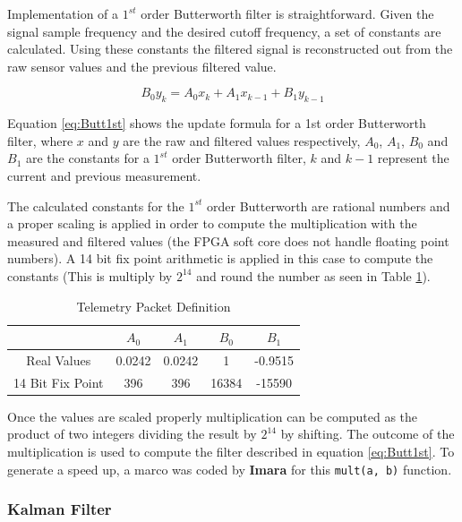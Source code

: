 \documentclass{article}
\begin{document}
Implementation of a $1^{st}$ order Butterworth filter is straightforward. Given the signal sample frequency and the desired cutoff frequency, a set of constants are calculated. Using these constants the filtered signal is reconstructed out from the raw sensor values and the previous filtered value.

\begin{equation}
	 B_0 y_k = A_0 x_k + A_1 x_{k-1} + B_1 y_{k-1}
	 \label{eq:Butt1st}
\end{equation}

Equation \ref{eq:Butt1st} shows the update formula for a 1st order Butterworth filter, where $x$ and $y$ are the raw and filtered values respectively, $A_0$, $A_1$, $B_0$ and $B_1$ are the constants for a $1^{st}$ order Butterworth filter, $k$ and $k-1$ represent the current and previous measurement.

The calculated constants for the $1^{st}$ order Butterworth are rational numbers and a proper scaling is applied in order to compute the multiplication with the measured and filtered values (the FPGA soft core does not handle floating point numbers). A 14 bit fix point arithmetic is applied in this case to compute the constants (This is multiply by $2^{14}$ and round the number as seen in Table \ref{tbl:ButtConstants}).

\begin{table}[ht]
\centering
\caption{Telemetry Packet Definition}
\begin{tabular}{|c|c|c|c|c|}
\hline 
 & $A_0$ & $A_1$ & $B_0$ & $B_1$ \\ 
\hline 
Real Values & 0.0242 & 0.0242 & 1 & -0.9515 \\ 
\hline 
14 Bit Fix Point & 396 & 396 & 16384 & -15590 \\ 
\hline 
\end{tabular}
\label{tbl:ButtConstants}
\end{table}

Once the values are scaled properly multiplication can be computed as the product of two integers dividing the result by $2^{14}$ by shifting. The outcome of the multiplication is used to compute the filter described in equation \ref{eq:Butt1st}. To generate a speed up, a marco was coded by \textbf{Imara} for this \texttt{mult(a, b)} function. 

\subsubsection{Kalman Filter}
\end{document}
